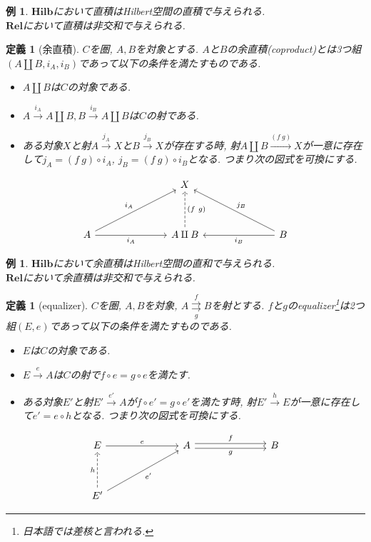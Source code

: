 \documentclass[a4paper,12pt]{ltjsarticle}
\theoremstyle{break}
\newtheorem{defn}[thm]{定義}
\newtheorem{eg}[thm]{例}
\newcommand{\rel}{\mathbf{Rel}}
\newcommand{\hilb}{\mathbf{Hilb}}
\newcommand{\xr}[1]{\xrightarrow{#1}}
\newcommand{\ci}{\circ}
\newcommand{\am}{\amalg}
\numberwithin{equation}{section}
\begin{document}
\begin{eg}
  $\hilb$において直積はHilbert空間の直積で与えられる. \\
  $\rel$において直積は非交和で与えられる. 
\end{eg}

\begin{defn}[余直積]
  $C$を圏, $A, B$を対象とする. 
  $A$と$B$の余直積(coproduct)とは3つ組$(A \am B, i_A, i_B)$であって以下の条件を満たすものである.
  \begin{itemize} 
    \item $A \am B$は$C$の対象である. 
    \item $A \xr{i_A} A \am B, B \xr{i_B} A \am B$は$C$の射である. 
    \item ある対象$X$と射$A \xr{j_A} X$と$B \xr{j_B} X$が存在する時, 射$A \am B \xr{(f~g)} X$が一意に存在して$j_A = (f~g) \ci i_A$, $j_B = (f~g) \ci i_B$となる. 
    つまり次の図式を可換にする. 
  \end{itemize}   
  \[\begin{tikzcd}
    &&& X \\
    \\
    A &&& {A \am B} &&& B
    \arrow["{(f~g)}"', dashed,  from=3-4, to=1-4]
    \arrow["{i_A}", from=3-1, to=1-4]
    \arrow["{i_A}"', from=3-1, to=3-4]
    \arrow["{j_B}"', from=3-7, to=1-4]
    \arrow["{i_B}", from=3-7, to=3-4]
  \end{tikzcd}\]
\end{defn}

\begin{eg}
  $\hilb$において余直積はHilbert空間の直和で与えられる. \\
  $\rel$において余直積は非交和で与えられる. 
\end{eg}

\begin{defn}[equalizer]
  $C$を圏, $A, B$を対象, $A \overset{f}{\underset{g}{\rightrightarrows}} B$を射とする. 
  $f$と$g$のequalizer\footnote{日本語では差核と言われる.}は2つ組$(E, e)$であって以下の条件を満たすものである. 
  \begin{itemize}
    \item $E$は$C$の対象である. 
    \item $E \xr{e} A$は$C$の射で$f \ci e = g \ci e$を満たす. 
    \item ある対象$E'$と射$E' \xr{e'} A$が$f \ci e' = g \ci e'$を満たす時, 射$E' \xr{h} E$が一意に存在して$e' = e \ci h$となる. 
    つまり次の図式を可換にする. 
  \end{itemize}
  \[\begin{tikzcd}
	  E &&& A &&& B \\
	  \\
	  {E'}
	  \arrow["g"', shift right=1, from=1-4, to=1-7]
	  \arrow["{e'}"', from=3-1, to=1-4]
	  \arrow["e", from=1-1, to=1-4]
	  \arrow["h", from=3-1, dashed, to=1-1]
	  \arrow["f", shift left=1, from=1-4, to=1-7]
  \end{tikzcd}\]
\end{defn}
\end{document}
